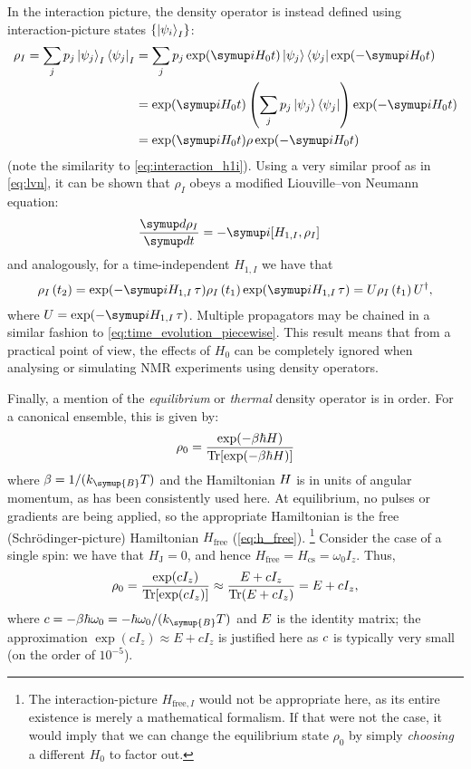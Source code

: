 In the interaction picture, the density operator is instead defined using interaction-picture states $\{\ket{\psi_i}_I\}$:
\begin{align}
    \label{eq:density_matrix_interaction}
    \rho_I = \sum_j p_j \ket{\psi_j}_I \bra{\psi_j}_I
           &= \sum_j p_j \exp(\mi H_0 t)\ket{\psi_j} \bra{\psi_j} \exp(-\mi H_0 t) \notag \\
           &= \exp(\mi H_0 t) \left(\sum_j p_j \ket{\psi_j} \bra{\psi_j}\right) \exp(-\mi H_0 t) \notag \\
           &= \exp(\mi H_0 t) \rho \exp(-\mi H_0 t)
\end{align}
(note the similarity to \cref{eq:interaction_h1i}).
Using a very similar proof as in \cref{eq:lvn}, it can be shown that $\rho_I$ obeys a modified Liouville--von Neumann equation:
\begin{align}
    \label{eq:lvn_interaction}
    \frac{\md\rho_I}{\md t} &= -\mi[H_{1,I}, \rho_I]
\end{align}
and analogously, for a time-independent $H_{1,I}$ we have that
\begin{align}
    \label{eq:lvn_interaction_integrated}
    \rho_I\,(t_2) = \exp(-\mi H_{1,I}\,\tau)\rho_I\,(t_1)\exp(\mi H_{1,I}\,\tau) = U\rho_I\,(t_1) \, U^\dagger,
\end{align}
where $U = \exp(-\mi H_{1,I}\,\tau)$.
Multiple propagators may be chained in a similar fashion to \cref{eq:time_evolution_piecewise}.
This result means that from a practical point of view, the effects of $H_0$ can be completely ignored when analysing or simulating NMR experiments using density operators.

Finally, a mention of the \textit{equilibrium} or \textit{thermal} density operator is in order.
For a canonical ensemble, this is given by:
\begin{equation}
    \label{eq:thermal_density_operator}
    \rho_0 = \frac{\exp(-\beta\hbar H)}{\operatorname{Tr}[\exp(-\beta\hbar H)]}
\end{equation}
where $\beta = 1/(k_{\symup{B}}T)$ and the Hamiltonian $H\/$ is in units of angular momentum, as has been consistently used here.
At equilibrium, no pulses or gradients are being applied, so the appropriate Hamiltonian is the free (Schr\"odinger-picture) Hamiltonian $H_\text{free}$ (\cref{eq:h_free}).%
\footnote{The interaction-picture $H_{\text{free},I}$ would not be appropriate here, as its entire existence is merely a mathematical formalism. If that were not the case, it would imply that we can change the equilibrium state $\rho_0$ by simply \textit{choosing} a different $H_0$ to factor out.}
Consider the case of a single spin: we have that $H_\text{J} = 0$, and hence $H_\text{free} = H_\text{cs} = \omega_0 I_z$. Thus,
\begin{equation}
    \label{eq:nmr_equilibrium_rho}
    \rho_0 = \frac{\exp(cI_z)}{\operatorname{Tr}[\exp(cI_z)]} \approx \frac{E + cI_z}{\operatorname{Tr}(E + cI_z)} = E + cI_z,
\end{equation}
where $c = -\beta\hbar\omega_0 = -\hbar\omega_0/(k_{\symup{B}}T)$ and $E\/$ is the identity matrix; the approximation $\exp(cI_z) \approx E + cI_z$ is justified here as $c\/$ is typically very small (on the order of $10^{-5}$).

